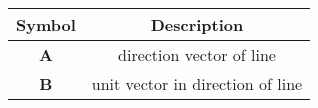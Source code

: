 \begin{tabular}[12pt]{ |c|c|}
    \hline
    \textbf{Symbol} & \textbf{Description} \\
    \hline
    \textbf{A} & direction vector of line\\
    \hline
    \textbf{B} & unit vector in direction of line\\
    \hline
    \end{tabular}
